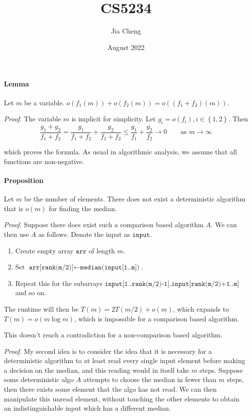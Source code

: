 \documentclass[a4paper]{article}
\title{CS5234}
\author{Jia Cheng}
\date{August 2022}
\newcommand{\set}[1]{\left\lbrace #1 \right\rbrace} %
\begin{document}
\maketitle

\paragraph{Lemma} Let $m$ be a variable. $o(f_1(m)) + o(f_2(m)) = o((f_1 + f_2)(m))$.

\textit{Proof}. The variable $m$ is implicit for simplicity. Let $g_i = o(f_i), i\in \set{1, 2}$. Then
\begin{equation}
	\frac{g_1 + g_2}{f_1 + f_2} = \frac{g_1}{f_1 + f_2} + \frac{g_2}{f_1 + f_2} \leq \frac{g_1}{f_1} + \frac{g_2}{f_2} \rightarrow 0 \qquad \text{as }m\rightarrow\infty
\end{equation}

which proves the formula. As usual in algorithmic analysis, we assume that all functions are non-negative.

\paragraph{Proposition} Let $m$ be the number of elements. There does not exist a deterministic algorithm that is $o(m)$ for finding the median.

\textit{Proof}. Suppose there does exist such a comparison based algorithm $A$. We can then use $A$ as follows. Denote the input as $\texttt{input}$.
\begin{enumerate}
	\item Create empty array $\texttt{arr}$ of length $m$.
	\item Set $\texttt{arr[rank(m/2)]}\gets \texttt{median(input[1..m])}$.
	\item Repeat this for the subarrays $\texttt{input[1..rank(m/2)-1]}, \texttt{input[rank(m/2)+1..m]}$ and so on.
\end{enumerate}
The runtime will then be $T(m) = 2T(m/2) + o(m)$, which expands to $T(m) = o(m\log m)$, which is impossible for a comparison based algorithm.

This doesn't reach a contradiction for a non-comparison based algorithm.

\textit{Proof}. My second idea is to consider the idea that it is necessary for a deterministic algorithm to at least read every single input element before making a decision on the median, and this reading would in itself take $m$ steps. Suppose some deterministic algo $A$ attempts to choose the median in fewer than $m$ steps, then there exists some element that the algo has not read. We can then manipulate this unread element, without touching the other elements to obtain an indistinguishable input which has a different median.
\end{document}
